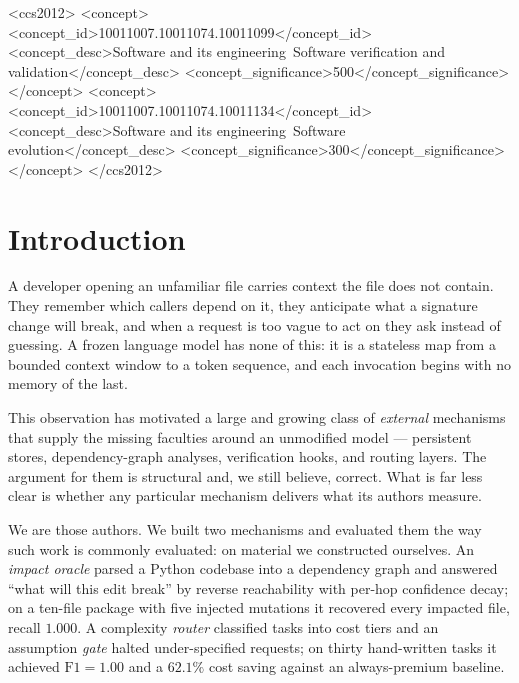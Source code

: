 \documentclass[sigconf,review,anonymous]{acmart}
\begin{document}
\begin{CCSXML}
<ccs2012>
<concept><concept_id>10011007.10011074.10011099</concept_id>
<concept_desc>Software and its engineering~Software verification and validation</concept_desc>
<concept_significance>500</concept_significance></concept>
<concept><concept_id>10011007.10011074.10011134</concept_id>
<concept_desc>Software and its engineering~Software evolution</concept_desc>
<concept_significance>300</concept_significance></concept>
</ccs2012>
\end{CCSXML}

\maketitle

\section{Introduction}

A developer opening an unfamiliar file carries context the file does not contain. They
remember which callers depend on it, they anticipate what a signature change will break,
and when a request is too vague to act on they ask instead of guessing. A frozen language
model has none of this: it is a stateless map from a bounded context window to a token
sequence, and each invocation begins with no memory of the last.

This observation has motivated a large and growing class of \emph{external} mechanisms
that supply the missing faculties around an unmodified model --- persistent stores,
dependency-graph analyses, verification hooks, and routing layers. The argument for them
is structural and, we still believe, correct. What is far less clear is whether any
particular mechanism delivers what its authors measure.

We are those authors. We built two mechanisms and evaluated them the way such work is
commonly evaluated: on material we constructed ourselves. An \emph{impact oracle} parsed a
Python codebase into a dependency graph and answered ``what will this edit break'' by
reverse reachability with per-hop confidence decay; on a ten-file package with five
injected mutations it recovered every impacted file, recall $1.000$. A complexity
\emph{router} classified tasks into cost tiers and an assumption \emph{gate} halted
under-specified requests; on thirty hand-written tasks it achieved $\mathrm{F1}=1.00$ and
a $62.1\%$ cost saving against an always-premium baseline.
\end{document}
